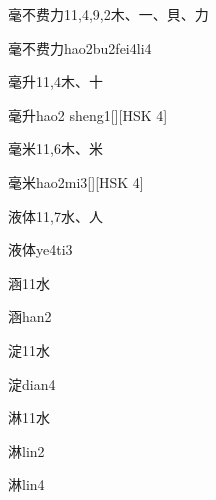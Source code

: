 \begin{entry}{毫不费力}{11,4,9,2}{⽊、⼀、⾙、⼒}
  \begin{phonetics}{毫不费力}{hao2bu2fei4li4}
  \end{phonetics}
\end{entry}

\begin{entry}{毫升}{11,4}{⽊、⼗}
  \begin{phonetics}{毫升}{hao2 sheng1}[][HSK 4]
  \end{phonetics}
\end{entry}

\begin{entry}{毫米}{11,6}{⽊、⽶}
  \begin{phonetics}{毫米}{hao2mi3}[][HSK 4]
  \end{phonetics}
\end{entry}

\begin{entry}{液体}{11,7}{⽔、⼈}
  \begin{phonetics}{液体}{ye4ti3}
  \end{phonetics}
\end{entry}

\begin{entry}{涵}{11}{⽔}
  \begin{phonetics}{涵}{han2}
  \end{phonetics}
\end{entry}

\begin{entry}{淀}{11}{⽔}
  \begin{phonetics}{淀}{dian4}
  \end{phonetics}
\end{entry}

\begin{entry}{淋}{11}{⽔}
  \begin{phonetics}{淋}{lin2}
  \end{phonetics}
  \begin{phonetics}{淋}{lin4}
  \end{phonetics}
\end{entry}

